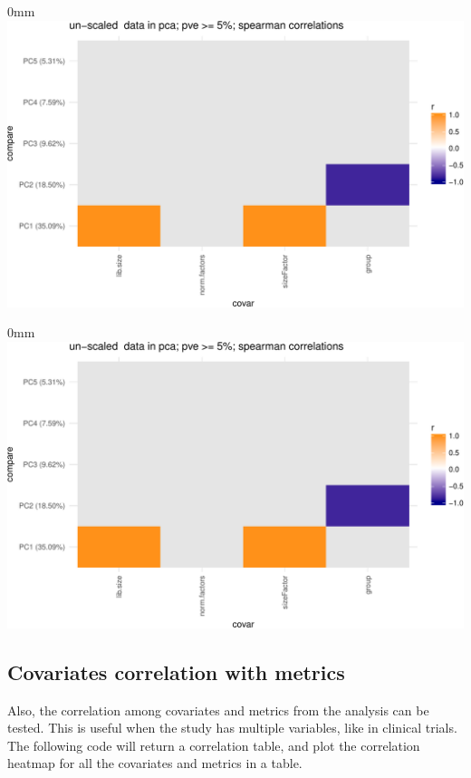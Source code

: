 \documentclass{article}
\begin{document}
\begin{knitrout}
\color{fgcolor}\begin{kframe}
\begin{alltt}
 \hlkwb{<-} \hlstd{(}\hlstd{(}\hlopt{+}\hlstd{),}
\end{alltt}
\end{kframe}\begin{adjustwidth}{\fltoffset}{0mm}
\includegraphics[width=\maxwidth]{figure/chunk-covariates-1} \end{adjustwidth}\begin{kframe}\begin{alltt}
\hlopt{$}
\end{alltt}
\end{kframe}\begin{adjustwidth}{\fltoffset}{0mm}
\includegraphics[width=\maxwidth]{figure/chunk-covariates-2} \end{adjustwidth}
\end{knitrout}


\subsection{Covariates correlation with metrics}

Also, the correlation among covariates and metrics from the analysis can
be tested. This is useful when the study has multiple variables, like in
clinical trials. The following code will return a correlation table, and
plot the correlation heatmap for all the covariates and metrics in a table.
\end{document}
